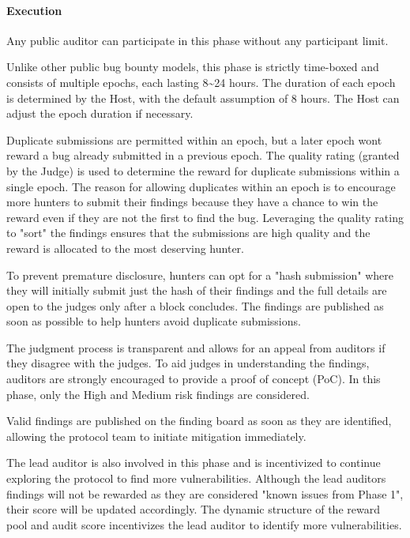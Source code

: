 \documentclass[10pt]{extarticle}
\begin{document}
\paragraph{Execution}\label{execution-1}

Any public auditor can participate in this phase without any participant
limit.

Unlike other public bug bounty models, this phase is strictly time-boxed
and consists of multiple epochs, each lasting 8\textasciitilde24 hours.
The duration of each epoch is determined by the Host, with the default
assumption of 8 hours. The Host can adjust the epoch duration if
necessary.

Duplicate submissions are permitted within an epoch, but a later epoch
won\textquotesingle t reward a bug already submitted in a previous
epoch. The quality rating (granted by the Judge) is used to determine
the reward for duplicate submissions within a single epoch. The reason
for allowing duplicates within an epoch is to encourage more hunters to
submit their findings because they have a chance to win the reward even
if they are not the first to find the bug. Leveraging the quality rating
to "sort" the findings ensures that the submissions are high quality and
the reward is allocated to the most deserving hunter.

To prevent premature disclosure, hunters can opt for a "hash submission"
where they will initially submit just the hash of their findings and the
full details are open to the judges only after a block concludes. The
findings are published as soon as possible to help hunters avoid
duplicate submissions.

The judgment process is transparent and allows for an appeal from
auditors if they disagree with the judges. To aid judges in
understanding the findings, auditors are strongly encouraged to provide
a proof of concept (PoC). In this phase, only the High and Medium risk
findings are considered.

Valid findings are published on the finding board as soon as they are
identified, allowing the protocol team to initiate mitigation
immediately.

The lead auditor is also involved in this phase and is incentivized to
continue exploring the protocol to find more vulnerabilities. Although
the lead auditor\textquotesingle s findings will not be rewarded as they
are considered "known issues from Phase 1", their score will be updated
accordingly. The dynamic structure of the reward pool and audit score
incentivizes the lead auditor to identify more vulnerabilities.
\end{document}
